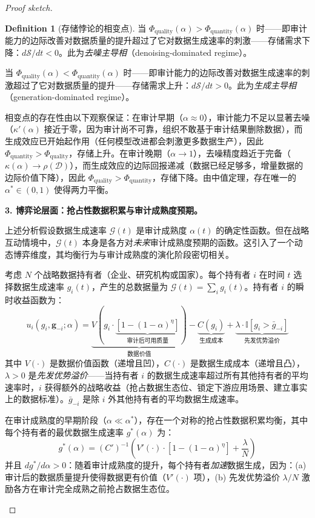 \documentclass[12pt,a4paper]{ctexart}
\theoremstyle{definition}
\newtheorem{definition}{Definition}[section]
\theoremstyle{remark}
\begin{document}
\begin{proof}[Proof sketch]
\begin{definition}[存储悖论的相变点]
当 $\Phi_{\text{quality}}(\alpha) > \Phi_{\text{quantity}}(\alpha)$ 时——即审计能力的边际改善对数据质量的提升超过了它对数据生成速率的刺激——存储需求下降：$d\mathcal{S}/dt < 0$。此为\textit{去噪主导相}（denoising-dominated regime）。

当 $\Phi_{\text{quality}}(\alpha) < \Phi_{\text{quantity}}(\alpha)$ 时——即审计能力的边际改善对数据生成速率的刺激超过了它对数据质量的提升——存储需求上升：$d\mathcal{S}/dt > 0$。此为\textit{生成主导相}（generation-dominated regime）。

相变点的存在性由以下观察保证：在审计早期（$\alpha \approx 0$），审计能力不足以显著去噪（$\kappa'(\alpha)$ 接近于零，因为审计尚不可靠，组织不敢基于审计结果删除数据），而生成效应已开始起作用（任何模型改进都会刺激更多数据生产），因此 $\Phi_{\text{quantity}} > \Phi_{\text{quality}}$，存储上升。在审计晚期（$\alpha \to 1$），去噪精度趋近于完备（$\kappa(\alpha) \to \rho(\mathcal{D})$），而生成效应的边际回报递减（数据已经足够多，增量数据的边际价值下降），因此 $\Phi_{\text{quality}} > \Phi_{\text{quantity}}$，存储下降。由中值定理，存在唯一的 $\alpha^* \in (0, 1)$ 使得两力平衡。
\end{definition}

\medskip
\noindent\textbf{3. 博弈论层面：抢占性数据积累与审计成熟度预期。}

上述分析假设数据生成速率 $\mathcal{G}(t)$ 是审计成熟度 $\alpha(t)$ 的确定性函数。但在战略互动情境中，$\mathcal{G}(t)$ 本身是各方对\textit{未来}审计成熟度预期的函数。这引入了一个动态博弈维度，其均衡行为与审计成熟度的演化阶段密切相关。

考虑 $N$ 个战略数据持有者（企业、研究机构或国家）。每个持有者 $i$ 在时间 $t$ 选择数据生成速率 $g_i(t)$，产生的总数据量为 $\mathcal{G}(t) = \sum_i g_i(t)$。持有者 $i$ 的瞬时收益函数为：
\begin{equation}
u_i(g_i, \mathbf{g}_{-i}; \alpha) = \underbrace{V\left(g_i \cdot \underbrace{\left[1 - (1-\alpha)^{\eta}\right]}_{\text{审计后可用质量}}\right)}_{\text{数据价值}} - \underbrace{C(g_i)}_{\text{生成成本}} + \underbrace{\lambda \cdot \mathbb{I}\left[g_i > \bar{g}_{-i}\right]}_{\text{先发优势溢价}}
\end{equation}
其中 $V(\cdot)$ 是数据价值函数（递增且凹），$C(\cdot)$ 是数据生成成本（递增且凸），$\lambda > 0$ 是\textit{先发优势溢价}——当持有者 $i$ 的数据生成速率超过所有其他持有者的平均速率时，$i$ 获得额外的战略收益（抢占数据生态位、锁定下游应用场景、建立事实上的数据标准）。$\bar{g}_{-i}$ 是除 $i$ 外其他持有者的平均数据生成速率。

\begin{proposition}[抢占性数据积累竞赛]
\label{prop:preemptive}
在审计成熟度的早期阶段（$\alpha \ll \alpha^*$），存在一个对称的抢占性数据积累均衡，其中每个持有者的最优数据生成速率 $g^*(\alpha)$ 为：
\begin{equation}
g^*(\alpha) = (C')^{-1}\left(V'(\cdot) \cdot [1 - (1-\alpha)^{\eta}] + \frac{\lambda}{N}\right)
\end{equation}
并且 $dg^*/d\alpha > 0$：随着审计成熟度的提升，每个持有者\textit{加速}数据生成，因为：(a) 审计后的数据质量提升使得数据更有价值（$V'(\cdot)$ 项），(b) 先发优势溢价 $\lambda/N$ 激励各方在审计完全成熟之前抢占数据生态位。


\end{proposition}
\end{proof}
\end{document}
